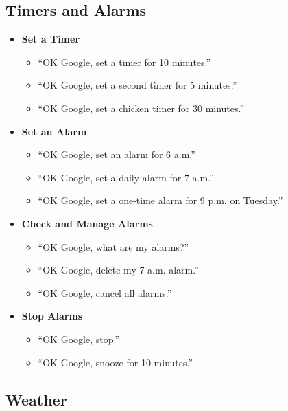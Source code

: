 \documentclass[
  jou,
  floatsintext,
  longtable,
  a4paper,
  nolmodern,
  notxfonts,
  notimes,
  colorlinks=true,linkcolor=blue,citecolor=blue,urlcolor=blue]{apa7}
\providecommand{\tightlist}{%
  \setlength{\itemsep}{0pt}\setlength{\parskip}{0pt}}
\begin{document}
\subsection{Timers and Alarms}\label{timers-and-alarms}

\begin{itemize}
\tightlist
\item
  \textbf{Set a Timer}

  \begin{itemize}
  \tightlist
  \item
    ``OK Google, set a timer for 10 minutes.''
  \item
    ``OK Google, set a second timer for 5 minutes.''
  \item
    ``OK Google, set a chicken timer for 30 minutes.''
  \end{itemize}
\item
  \textbf{Set an Alarm}

  \begin{itemize}
  \tightlist
  \item
    ``OK Google, set an alarm for 6 a.m.''
  \item
    ``OK Google, set a daily alarm for 7 a.m.''
  \item
    ``OK Google, set a one-time alarm for 9 p.m. on Tuesday.''
  \end{itemize}
\item
  \textbf{Check and Manage Alarms}

  \begin{itemize}
  \tightlist
  \item
    ``OK Google, what are my alarms?''
  \item
    ``OK Google, delete my 7 a.m. alarm.''
  \item
    ``OK Google, cancel all alarms.''
  \end{itemize}
\item
  \textbf{Stop Alarms}

  \begin{itemize}
  \tightlist
  \item
    ``OK Google, stop.''
  \item
    ``OK Google, snooze for 10 minutes.''
  \end{itemize}
\end{itemize}

\subsection{Weather}\label{weather}
\end{document}
